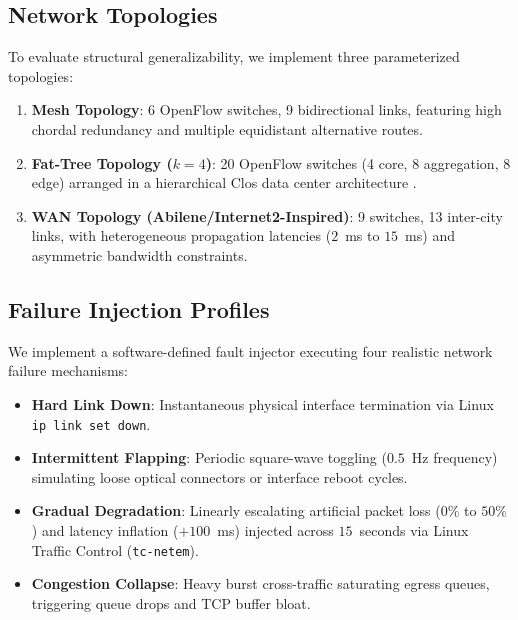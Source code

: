 \documentclass[10pt,twocolumn]{article}
\begin{document}
\subsection{Network Topologies}
To evaluate structural generalizability, we implement three parameterized topologies:
\begin{enumerate}
    \item \textbf{Mesh Topology}: 6 OpenFlow switches, 9 bidirectional links, featuring high chordal redundancy and multiple equidistant alternative routes.
    \item \textbf{Fat-Tree Topology ($k=4$)}: 20 OpenFlow switches (4 core, 8 aggregation, 8 edge) arranged in a hierarchical Clos data center architecture \cite{alfares2008fattree}.
    \item \textbf{WAN Topology (Abilene/Internet2-Inspired)}: 9 switches, 13 inter-city links, with heterogeneous propagation latencies ($2$~ms to $15$~ms) and asymmetric bandwidth constraints.
\end{enumerate}

\subsection{Failure Injection Profiles}
We implement a software-defined fault injector executing four realistic network failure mechanisms:
\begin{itemize}
    \item \textbf{Hard Link Down}: Instantaneous physical interface termination via Linux \texttt{ip link set down}.
    \item \textbf{Intermittent Flapping}: Periodic square-wave toggling ($0.5$~Hz frequency) simulating loose optical connectors or interface reboot cycles.
    \item \textbf{Gradual Degradation}: Linearly escalating artificial packet loss ($0\%$ to $50\%$) and latency inflation ($+100$~ms) injected across $15$~seconds via Linux Traffic Control (\texttt{tc-netem}).
    \item \textbf{Congestion Collapse}: Heavy burst cross-traffic saturating egress queues, triggering queue drops and TCP buffer bloat.
\end{itemize}
\end{document}
